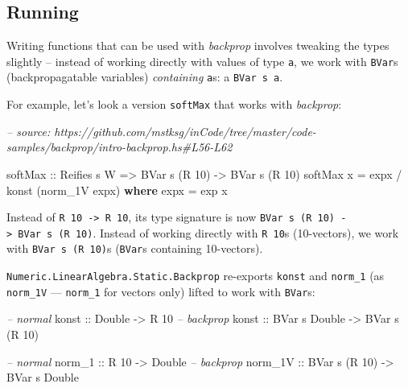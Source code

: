 \documentclass[]{article}
\newenvironment{Shaded}{}{}
\newcommand{\CommentTok}[1]{\textcolor[rgb]{0.38,0.63,0.69}{\textit{#1}}}
\newcommand{\DataTypeTok}[1]{\textcolor[rgb]{0.56,0.13,0.00}{#1}}
\newcommand{\DecValTok}[1]{\textcolor[rgb]{0.25,0.63,0.44}{#1}}
\newcommand{\FunctionTok}[1]{\textcolor[rgb]{0.02,0.16,0.49}{#1}}
\newcommand{\KeywordTok}[1]{\textcolor[rgb]{0.00,0.44,0.13}{\textbf{#1}}}
\newcommand{\NormalTok}[1]{#1}
\newcommand{\OtherTok}[1]{\textcolor[rgb]{0.00,0.44,0.13}{#1}}
\begin{document}
\hypertarget{running-1}{%
\subsection{Running}\label{running-1}}

Writing functions that can be used with \emph{backprop} involves tweaking the
types slightly -- instead of working directly with values of type \texttt{a}, we
work with \texttt{BVar}s (backpropagatable variables) \emph{containing}
\texttt{a}s: a \texttt{BVar\ s\ a}.

For example, let's look a version \texttt{softMax} that works with
\emph{backprop}:

\begin{Shaded}
\begin{Highlighting}[]
\CommentTok{-- source: https://github.com/mstksg/inCode/tree/master/code-samples/backprop/intro-backprop.hs#L56-L62}

\NormalTok{softMax}
\OtherTok{    ::} \DataTypeTok{Reifies}\NormalTok{ s }\DataTypeTok{W}
    \OtherTok{=>} \DataTypeTok{BVar}\NormalTok{ s (}\DataTypeTok{R} \DecValTok{10}\NormalTok{)}
    \OtherTok{->} \DataTypeTok{BVar}\NormalTok{ s (}\DataTypeTok{R} \DecValTok{10}\NormalTok{)}
\NormalTok{softMax x }\FunctionTok{=}\NormalTok{ expx }\FunctionTok{/}\NormalTok{ konst (norm_1V expx)}
  \KeywordTok{where}
\NormalTok{    expx }\FunctionTok{=}\NormalTok{ exp x}
\end{Highlighting}
\end{Shaded}

Instead of \texttt{R\ 10\ -\textgreater{}\ R\ 10}, its type signature is now
\texttt{BVar\ s\ (R\ 10)\ -\textgreater{}\ BVar\ s\ (R\ 10)}. Instead of working
directly with \texttt{R\ 10}s (10-vectors), we work with
\texttt{BVar\ s\ (R\ 10)}s (\texttt{BVar}s containing 10-vectors).

\texttt{Numeric.LinearAlgebra.Static.Backprop} re-exports \texttt{konst} and
\texttt{norm\_1} (as \texttt{norm\_1V} --- \texttt{norm\_1} for vectors only)
lifted to work with \texttt{BVar}s:

\begin{Shaded}
\begin{Highlighting}[]
\CommentTok{-- normal}
\OtherTok{konst   ::}        \DataTypeTok{Double} \OtherTok{->}         \DataTypeTok{R} \DecValTok{10}
\CommentTok{-- backprop}
\OtherTok{konst   ::} \DataTypeTok{BVar}\NormalTok{ s }\DataTypeTok{Double} \OtherTok{->} \DataTypeTok{BVar}\NormalTok{ s (}\DataTypeTok{R} \DecValTok{10}\NormalTok{)}

\CommentTok{-- normal}
\OtherTok{norm_1  ::}         \DataTypeTok{R} \DecValTok{10}  \OtherTok{->}        \DataTypeTok{Double}
\CommentTok{-- backprop}
\OtherTok{norm_1V ::} \DataTypeTok{BVar}\NormalTok{ s (}\DataTypeTok{R} \DecValTok{10}\NormalTok{) }\OtherTok{->} \DataTypeTok{BVar}\NormalTok{ s }\DataTypeTok{Double}
\end{Highlighting}
\end{Shaded}
\end{document}
